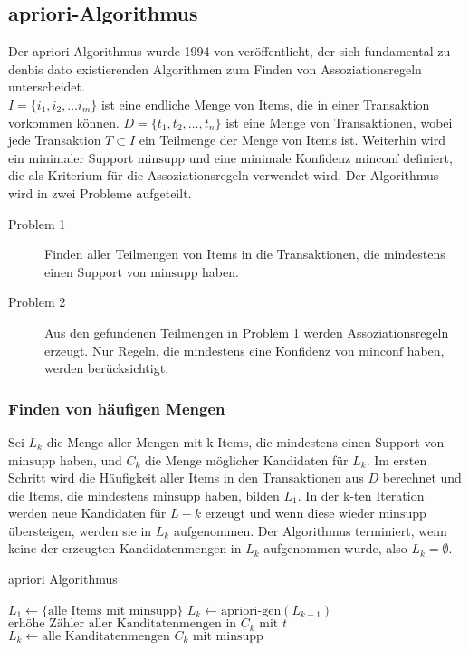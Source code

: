 \subsection{apriori-Algorithmus}
Der apriori-Algorithmus wurde 1994 von \cite{Agrawal:1994:FAM:645920.672836}  veröffentlicht, der sich fundamental zu denbis dato existierenden Algorithmen zum Finden von Assoziationsregeln unterscheidet. \\
$I = \{i_1, i_2, \ldots i_m\}$ ist eine endliche Menge von Items, die in einer Transaktion vorkommen können.
$D = \{t_1, t_2, \ldots , t_n\}$ ist eine Menge von Transaktionen, wobei jede Transaktion $T \subset I$ ein Teilmenge der Menge von Items ist. Weiterhin wird ein minimaler Support $\mathrm{minsupp}$ und eine minimale Konfidenz $\mathrm{minconf}$ definiert, die als Kriterium für die Assoziationsregeln verwendet wird. Der Algorithmus wird in zwei Probleme aufgeteilt.
\begin{description}
	\item[Problem 1] Finden aller Teilmengen von Items in die Transaktionen, die mindestens einen Support von $\mathrm{minsupp}$ haben.
	\item[Problem 2] Aus den gefundenen Teilmengen in Problem 1 werden Assoziationsregeln erzeugt. Nur Regeln, die mindestens eine Konfidenz von $\mathrm{minconf}$ haben, werden berücksichtigt.
\end{description}
\subsubsection{Finden von häufigen Mengen}
Sei $L_k$ die Menge aller Mengen mit k Items, die mindestens einen Support von $\mathrm{minsupp}$ haben, und $C_k$ die Menge möglicher Kandidaten für $L_k$. Im ersten Schritt wird die Häufigkeit aller Items in den Transaktionen aus $D$ berechnet und die Items, die mindestens $\mathrm{minsupp}$ haben, bilden $L_1$. In der k-ten Iteration werden neue Kandidaten für $L-k$ erzeugt und wenn diese wieder $\mathrm{minsupp}$ übersteigen, werden sie in $L_k$ aufgenommen. Der Algorithmus terminiert, wenn keine der erzeugten Kandidatenmengen in $L_k$ aufgenommen wurde, also $L_k = \emptyset$.
\begin{algorithm}
	\caption{apriori Algorithmus}
	\label{apriori}
\begin{algorithmic}
	\STATE $L_1\gets \{\text{alle Items mit } \mathrm{minsupp}\}$
		\STATE $L_k \gets \text{apriori-gen}(L_{k-1})$ 
		\STATE $\text{erhöhe Zähler aller Kanditatenmengen in } C_k \text{ mit } t$
		\ENDFOR \\
		$L_k \gets \text{alle Kanditatenmengen } C_k \text{ mit } \mathrm{minsupp}$
	\ENDFOR
\end{algorithmic}
\end{algorithm}

